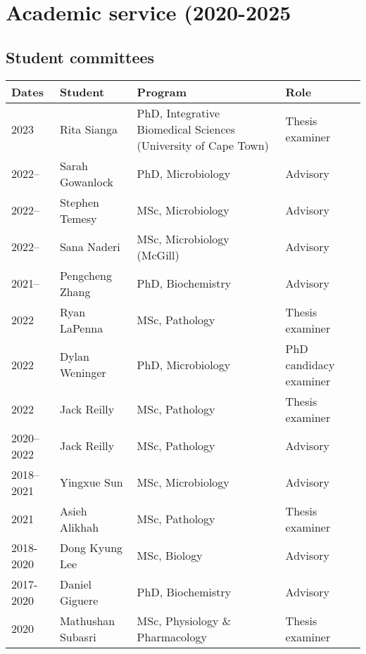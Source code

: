 
\section {Academic service (2020-2025}


\subsection  {\hspace{-1in} Student committees}

\begin{tabular}{lp{1.3in}p{2.4in}p{1.4in}}
Dates & Student & Program & Role\\
\hline

2023 & Rita Sianga & PhD, Integrative Biomedical Sciences (University of Cape Town) & Thesis examiner\\

2022-- & Sarah Gowanlock & PhD, Microbiology & Advisory\\
2022-- & Stephen Temesy & MSc, Microbiology & Advisory\\
2022-- & Sana Naderi & MSc, Microbiology (McGill) & Advisory\\
2021-- & Pengcheng Zhang & PhD, Biochemistry & Advisory\\

2022 & Ryan LaPenna & MSc, Pathology & Thesis examiner\\
2022 & Dylan Weninger & PhD, Microbiology & PhD candidacy examiner\\
2022 & Jack Reilly & MSc, Pathology & Thesis examiner\\

2020--2022 & Jack Reilly & MSc, Pathology & Advisory\\

2018--2021 & Yingxue Sun & MSc, Microbiology & Advisory\\

2021 & Asieh Alikhah & MSc, Pathology & Thesis examiner\\

2018-2020 & Dong Kyung Lee & MSc, Biology & Advisory\\

2017-2020 & Daniel Giguere & PhD, Biochemistry & Advisory\\

2020 & Mathushan Subasri & MSc, Physiology \& Pharmacology & Thesis examiner\\


\end{tabular}
